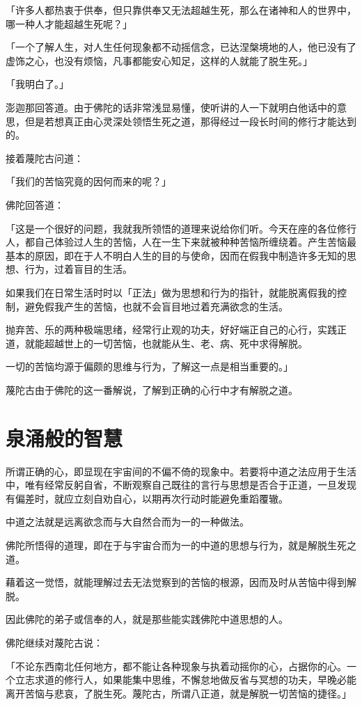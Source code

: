 \documentclass[twoside,openany]{book}
\begin{document}
「许多人都热衷于供奉，但只靠供奉又无法超越生死，那么在诸神和人的世界中，哪一种人才能超越生死呢？」

「一个了解人生，对人生任何现象都不动摇信念，已达涅槃境地的人，他已没有了虚饰之心，也没有烦恼，凡事都能安心知足，这样的人就能了脱生死。」

「我明白了。」

澎迦那回答道。由于佛陀的话非常浅显易懂，使听讲的人一下就明白他话中的意思，但是若想真正由心灵深处领悟生死之道，那得经过一段长时间的修行才能达到的。

接着蔑陀古问道：

「我们的苦恼究竟的因何而来的呢？」

佛陀回答道：

「这是一个很好的问题，我就我所领悟的道理来说给你们听。今天在座的各位修行人，都自己体验过人生的苦恼，人在一生下来就被种种苦恼所缠绕着。产生苦恼最基本的原因，即在于人不明白人生的目的与使命，因而在假我中制造许多无知的思想、行为，过着盲目的生活。

如果我们在日常生活时时以「正法」做为思想和行为的指针，就能脱离假我的控制，避免假我产生的苦恼，也就不会盲目地过着充满欲念的生活。

抛弃苦、乐的两种极端思绪，经常行止观的功夫，好好端正自己的心行，实践正道，就能超越世上的一切苦恼，也就能从生、老、病、死中求得解脱。

一切的苦恼均源于偏颇的思维与行为，了解这一点是相当重要的。」

蔑陀古由于佛陀的这一番解说，了解到正确的心行中才有解脱之道。

\section{泉涌般的智慧}\label{sec5.3}

所谓正确的心，即显现在宇宙间的不偏不倚的现象中。若要将中道之法应用于生活中，唯有经常反躬自省，不断观察自己既往的言行与思想是否合于正道，一旦发现有偏差时，就应立刻自劝自心，以期再次行动时能避免重蹈覆辙。

中道之法就是远离欲念而与大自然合而为一的一种做法。

佛陀所悟得的道理，即在于与宇宙合而为一的中道的思想与行为，就是解脱生死之道。

藉着这一觉悟，就能理解过去无法觉察到的苦恼的根源，因而及时从苦恼中得到解脱。

因此佛陀的弟子或信奉的人，就是那些能实践佛陀中道思想的人。

佛陀继续对蔑陀古说：

「不论东西南北任何地方，都不能让各种现象与执着动摇你的心，占据你的心。一个立志求道的修行人，如果能集中思维，不懈怠地做反省与冥想的功夫，早晚必能离开苦恼与悲哀，了脱生死。蔑陀古，所谓八正道，就是解脱一切苦恼的捷径。」
\end{document}
